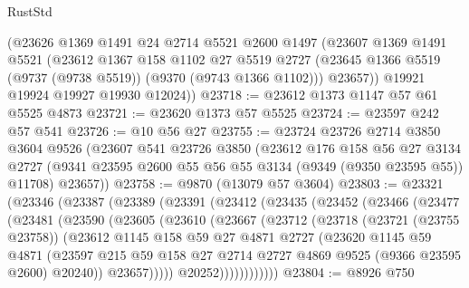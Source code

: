 \begin{lexlean}{RustStd}
\begin{coremodule}
{\begin{coremodule}
{{{{{{{{{{{{{{{{{{{{{{{{{{{{{{{{{{{{{{{      (@23626
        @1369
        @1491
        @24
        @2714
        @5521
        @2600
        @1497
        (@23607
          @1369
          @1491
          @5521
          (@23612
            @1367
            @158
            @1102
            @27
            @5519
            @2727
            (@23645 @1366 @5519 (@9737 (@9738 @5519)) (@9370 (@9743 @1366 @1102)))
            @23657))
        @19921
        @19924
        @19927
        @19930
        @12024))
@23718 := @23612 @1373 @1147 @57 @61 @5525 @4873
@23721 := @23620 @1373 @57 @5525
@23724 := @23597 @242 @57 @541
@23726 := @10 @56 @27
@23755 := @23724
    @23726
    @2714
    @3850
    @3604
    @9526
    (@23607
      @541
      @23726
      @3850
      (@23612
        @176
        @158
        @56
        @27
        @3134
        @2727
        (@9341 @23595 @2600 @55 @56 @55 @3134 (@9349 (@9350 @23595 @55)) @11708)
        @23657))
@23758 := @9870 (@13079 @57 @3604)
@23803 := @23321
    (@23346
      (@23387
        (@23389
          (@23391
            (@23412
              (@23435
                (@23452
                  (@23466
                    (@23477
                      (@23481
                        (@23590
                          (@23605
                            (@23610
                              (@23667
                                (@23712
                                  (@23718
                                    (@23721 (@23755 @23758))
                                    (@23612
                                      @1145
                                      @158
                                      @59
                                      @27
                                      @4871
                                      @2727
                                      (@23620
                                        @1145
                                        @59
                                        @4871
                                        (@23597
                                          @215
                                          @59
                                          @158
                                          @27
                                          @2714
                                          @2727
                                          @4869
                                          @9525
                                          (@9366 @23595 @2600)
                                          @20240))
                                      @23657)))))
                            @20252))))))))))))
@23804 := @8926 @750
}}}}}}}}}}}}}}}}}}}}}}}}}}}}}}}}}}}}}}}
\end{coremodule}}
\end{coremodule}
\end{lexlean}
